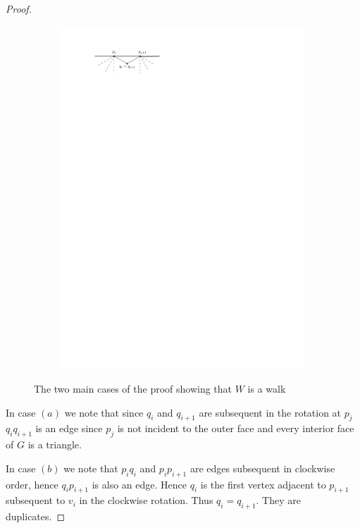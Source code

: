 \begin{proof}
\begin{figure}[h]
\begin{subfigure}[b]{0.5\linewidth}
          \caption{}
      \end{subfigure}%
      \begin{subfigure}[b]{0.5\linewidth}
          \includegraphics[width=\linewidth]{unifiedAlgo/img/walkProofB}
          \vspace{1cm}
          \caption{}
      \end{subfigure}
      \caption{The two main cases of the proof showing that $W$ is a walk}
      \label{fig:uni:walkproof}
    \end{figure}

    In case $(a)$ we note that since $q_i$ and $q_{i+1}$ are subsequent in the rotation at $p_j$ $q_i q_{i+1}$ is an edge since $p_j$ is not incident to the outer face and every interior face of $G$ is a triangle.

    In case $(b)$ we note that $p_i q_i$ and $p_i p_{i+1}$ are edges subsequent in clockwise order, hence $q_{i} p_{i+1}$ is also an edge. Hence $q_i$ is the first vertex adjacent to $p_{i+1}$ subsequent to $v_i$ in the clockwise rotation. Thus $q_{i} = q_{i+1}$. They are duplicates.


\end{proof}
